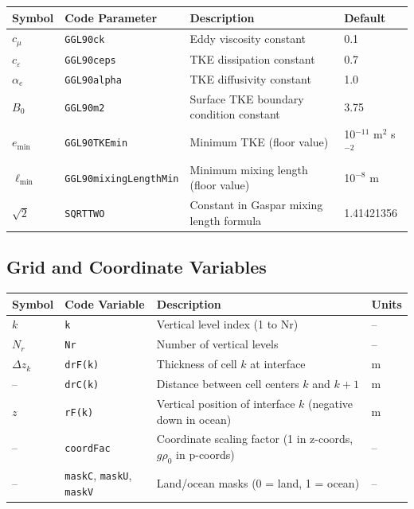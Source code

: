 \documentclass[12pt,letterpaper]{article}
\begin{document}
\begin{longtable}{p{2.5cm}p{4cm}p{6cm}l}
\toprule
\textbf{Symbol} & \textbf{Code Parameter} & \textbf{Description} & \textbf{Default} \\
\midrule
\endhead
$c_\mu$ & \verb|GGL90ck| & Eddy viscosity constant & 0.1 \\
\addlinespace
$c_\varepsilon$ & \verb|GGL90ceps| & TKE dissipation constant & 0.7 \\
\addlinespace
$\alpha_e$ & \verb|GGL90alpha| & TKE diffusivity constant & 1.0 \\
\addlinespace
$B_0$ & \verb|GGL90m2| & Surface TKE boundary condition constant & 3.75 \\
\addlinespace
$e_{\text{min}}$ & \verb|GGL90TKEmin| & Minimum TKE (floor value) & 10$^{-11}$ m$^2$ s$^{-2}$ \\
\addlinespace
$\ell_{\text{min}}$ & \verb|GGL90mixingLengthMin| & Minimum mixing length (floor value) & 10$^{-8}$ m \\
\addlinespace
$\sqrt{2}$ & \verb|SQRTTWO| & Constant in Gaspar mixing length formula & 1.41421356 \\
\bottomrule
\end{longtable}

\subsection*{Grid and Coordinate Variables}

\begin{longtable}{p{2.5cm}p{4cm}p{6cm}l}
\toprule
\textbf{Symbol} & \textbf{Code Variable} & \textbf{Description} & \textbf{Units} \\
\midrule
\endhead
$k$ & \verb|k| & Vertical level index (1 to Nr) & -- \\
\addlinespace
$N_r$ & \verb|Nr| & Number of vertical levels & -- \\
\addlinespace
$\Delta z_k$ & \verb|drF(k)| & Thickness of cell $k$ at interface & m \\
\addlinespace
-- & \verb|drC(k)| & Distance between cell centers $k$ and $k+1$ & m \\
\addlinespace
$z$ & \verb|rF(k)| & Vertical position of interface $k$ (negative down in ocean) & m \\
\addlinespace
-- & \verb|coordFac| & Coordinate scaling factor (1 in z-coords, $g\rho_0$ in p-coords) & -- \\
\addlinespace
-- & \verb|maskC|, \verb|maskU|, \verb|maskV| & Land/ocean masks (0 = land, 1 = ocean) & -- \\
\bottomrule
\end{longtable}
\end{document}
